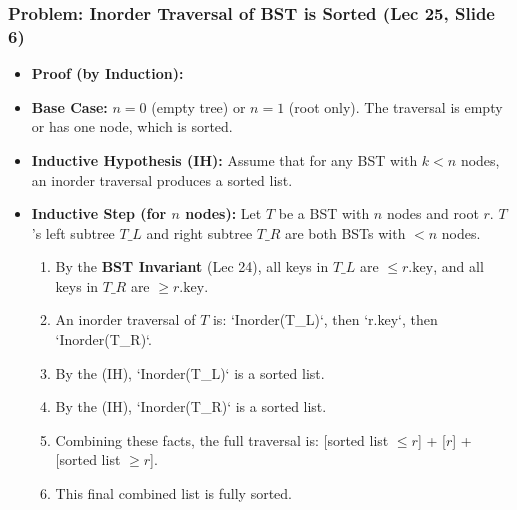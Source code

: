 \subsubsection{Problem: Inorder Traversal of BST is Sorted (Lec 25, Slide 6)}
\begin{itemize}
    \item \textbf{Proof (by Induction):}
    \item \textbf{Base Case:} $n=0$ (empty tree) or $n=1$ (root only). The traversal is empty or has one node, which is sorted.
    \item \textbf{Inductive Hypothesis (IH):} Assume that for any BST with $k < n$ nodes, an inorder traversal produces a sorted list.
    \item \textbf{Inductive Step (for $n$ nodes):} Let $T$ be a BST with $n$ nodes and root $r$. $T$'s left subtree $T\_L$ and right subtree $T\_R$ are both BSTs with $< n$ nodes.
    \begin{enumerate}
        \item By the \textbf{BST Invariant} (Lec 24), all keys in $T\_L$ are $\le r.\text{key}$, and all keys in $T\_R$ are $\ge r.\text{key}$.
        \item An inorder traversal of $T$ is: `Inorder(T\_L)`, then `r.key`, then `Inorder(T\_R)`.
        \item By the (IH), `Inorder(T\_L)` is a sorted list.
        \item By the (IH), `Inorder(T\_R)` is a sorted list.
        \item Combining these facts, the full traversal is: [sorted list $\le r$] + [$r$] + [sorted list $\ge r$].
        \item This final combined list is fully sorted.
    \end{enumerate}
\end{itemize}

